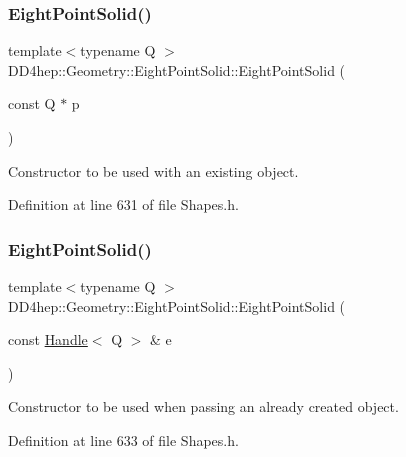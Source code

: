 \subsubsection{\texorpdfstring{Eight\+Point\+Solid()}{EightPointSolid()}\hspace{0.1cm}{\footnotesize\ttfamily [3/5]}}
{\footnotesize\ttfamily template$<$typename Q $>$ \\
D\+D4hep\+::\+Geometry\+::\+Eight\+Point\+Solid\+::\+Eight\+Point\+Solid (\begin{DoxyParamCaption}\item[{const Q $\ast$}]{p }\end{DoxyParamCaption})\hspace{0.3cm}{\ttfamily [inline]}}



Constructor to be used with an existing object. 



Definition at line 631 of file Shapes.\+h.

\hypertarget{class_d_d4hep_1_1_geometry_1_1_eight_point_solid_ae9f57f10fa7c2fc5f3f5e43732de4c00}{}\label{class_d_d4hep_1_1_geometry_1_1_eight_point_solid_ae9f57f10fa7c2fc5f3f5e43732de4c00} 
\subsubsection{\texorpdfstring{Eight\+Point\+Solid()}{EightPointSolid()}\hspace{0.1cm}{\footnotesize\ttfamily [4/5]}}
{\footnotesize\ttfamily template$<$typename Q $>$ \\
D\+D4hep\+::\+Geometry\+::\+Eight\+Point\+Solid\+::\+Eight\+Point\+Solid (\begin{DoxyParamCaption}\item[{const \hyperlink{class_d_d4hep_1_1_handle}{Handle}$<$ Q $>$ \&}]{e }\end{DoxyParamCaption})\hspace{0.3cm}{\ttfamily [inline]}}



Constructor to be used when passing an already created object. 



Definition at line 633 of file Shapes.\+h.

